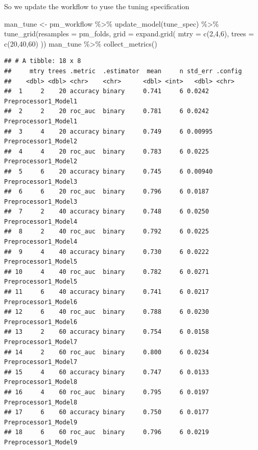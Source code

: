 \documentclass[
]{article}
\newenvironment{Shaded}{\begin{snugshade}}{\end{snugshade}}
\newcommand{\AttributeTok}[1]{\textcolor[rgb]{0.77,0.63,0.00}{#1}}
\newcommand{\DecValTok}[1]{\textcolor[rgb]{0.00,0.00,0.81}{#1}}
\newcommand{\FunctionTok}[1]{\textcolor[rgb]{0.00,0.00,0.00}{#1}}
\newcommand{\NormalTok}[1]{#1}
\newcommand{\OtherTok}[1]{\textcolor[rgb]{0.56,0.35,0.01}{#1}}
\newcommand{\SpecialCharTok}[1]{\textcolor[rgb]{0.00,0.00,0.00}{#1}}
\begin{document}
So we update the workflow to yuse the tuning specification

\begin{Shaded}
\begin{Highlighting}[]
\NormalTok{man\_tune }\OtherTok{\textless{}{-}}\NormalTok{ pm\_workflow }\SpecialCharTok{\%\textgreater{}\%} 
  \FunctionTok{update\_model}\NormalTok{(tune\_spec) }\SpecialCharTok{\%\textgreater{}\%}
  \FunctionTok{tune\_grid}\NormalTok{(}\AttributeTok{resamples =}\NormalTok{ pm\_folds,}
            \AttributeTok{grid =} \FunctionTok{expand.grid}\NormalTok{(}
                  \AttributeTok{mtry =} \FunctionTok{c}\NormalTok{(}\DecValTok{2}\NormalTok{,}\DecValTok{4}\NormalTok{,}\DecValTok{6}\NormalTok{),}
                  \AttributeTok{trees =} \FunctionTok{c}\NormalTok{(}\DecValTok{20}\NormalTok{,}\DecValTok{40}\NormalTok{,}\DecValTok{60}\NormalTok{)}
\NormalTok{            ))}
\NormalTok{man\_tune }\SpecialCharTok{\%\textgreater{}\%} \FunctionTok{collect\_metrics}\NormalTok{()}
\end{Highlighting}
\end{Shaded}

\begin{verbatim}
## # A tibble: 18 x 8
##     mtry trees .metric  .estimator  mean     n std_err .config             
##    <dbl> <dbl> <chr>    <chr>      <dbl> <int>   <dbl> <chr>               
##  1     2    20 accuracy binary     0.741     6 0.0242  Preprocessor1_Model1
##  2     2    20 roc_auc  binary     0.781     6 0.0242  Preprocessor1_Model1
##  3     4    20 accuracy binary     0.749     6 0.00995 Preprocessor1_Model2
##  4     4    20 roc_auc  binary     0.783     6 0.0225  Preprocessor1_Model2
##  5     6    20 accuracy binary     0.745     6 0.00940 Preprocessor1_Model3
##  6     6    20 roc_auc  binary     0.796     6 0.0187  Preprocessor1_Model3
##  7     2    40 accuracy binary     0.748     6 0.0250  Preprocessor1_Model4
##  8     2    40 roc_auc  binary     0.792     6 0.0225  Preprocessor1_Model4
##  9     4    40 accuracy binary     0.730     6 0.0222  Preprocessor1_Model5
## 10     4    40 roc_auc  binary     0.782     6 0.0271  Preprocessor1_Model5
## 11     6    40 accuracy binary     0.741     6 0.0217  Preprocessor1_Model6
## 12     6    40 roc_auc  binary     0.788     6 0.0230  Preprocessor1_Model6
## 13     2    60 accuracy binary     0.754     6 0.0158  Preprocessor1_Model7
## 14     2    60 roc_auc  binary     0.800     6 0.0234  Preprocessor1_Model7
## 15     4    60 accuracy binary     0.747     6 0.0133  Preprocessor1_Model8
## 16     4    60 roc_auc  binary     0.795     6 0.0197  Preprocessor1_Model8
## 17     6    60 accuracy binary     0.750     6 0.0177  Preprocessor1_Model9
## 18     6    60 roc_auc  binary     0.796     6 0.0219  Preprocessor1_Model9
\end{verbatim}
\end{document}
